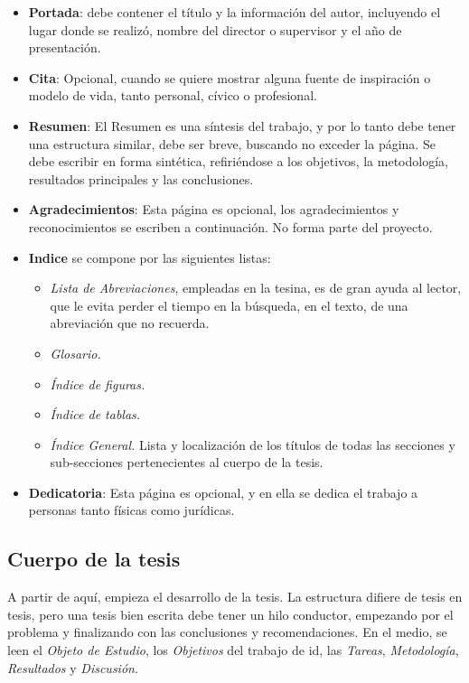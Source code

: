 \begin{itemize}
	\item \textbf{Portada}: debe contener el título  y la información del autor, incluyendo el lugar donde se realizó, nombre del director o supervisor y el año de presentación.
	\item \textbf{Cita}: Opcional, cuando se quiere mostrar alguna fuente de inspiración o modelo de vida, tanto personal, cívico o profesional.
	\item \textbf{Resumen}: El Resumen es una síntesis del trabajo, y por lo tanto debe tener una estructura similar, debe ser breve, buscando no exceder la página. Se debe escribir en forma sintética, refiriéndose a  los objetivos, la  metodología,  resultados principales y las conclusiones.
	\item \textbf{Agradecimientos}: Esta página es opcional, los agradecimientos  y reconocimientos se escriben a continuación. No forma parte del proyecto.
	
	\item \textbf{Indice} se compone por las siguientes listas:
	\begin{itemize}
		\item {\textit{Lista de Abreviaciones}, empleadas en la tesina, es de gran ayuda al lector, que le evita perder el tiempo en la búsqueda, en el texto, de una abreviación que no recuerda.}
		\item \textit{Glosario.}
		\item \textit{Índice de figuras.}
		\item \textit{Índice de tablas.}
		\item \textit{Índice General.} Lista y localización de los títulos de todas las secciones y sub-secciones pertenecientes al cuerpo de la tesis.
	\end{itemize}
	\item \textbf{Dedicatoria}: Esta página es opcional, y en ella se dedica el trabajo a personas tanto físicas como jurídicas.
\end{itemize}
\subsection{Cuerpo de la tesis}

A partir de aquí, empieza el desarrollo de la tesis. La estructura difiere de tesis en tesis, pero una tesis bien escrita debe tener un hilo conductor, empezando por el problema y finalizando con las conclusiones y recomendaciones. En el medio, se leen el \textit{Objeto de Estudio}, los \textit{Objetivos} del trabajo de \ac{id}, las \textit{Tareas}, \textit{Metodología}, \textit{Resultados} y \textit{Discusión}.


